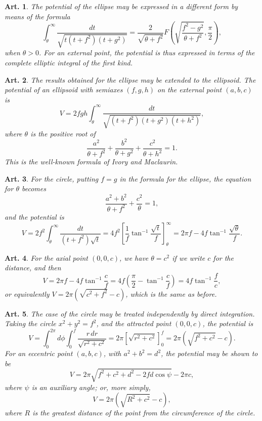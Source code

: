 \documentclass[12pt,a4paper]{article}
\theoremstyle{cayley}
\newtheorem{art}{Art.}[section]
\begin{document}
\begin{art}
The potential of the ellipse may be expressed in a different form by means of the formula
\[
\int_{\theta}^{\infty} \frac{dt}{\sqrt{t(t+f^2)(t+g^2)}}
= \frac{2}{\sqrt{\theta + f^2}}F\left(\sqrt{\frac{f^2-g^2}{\theta+f^2}}, \frac{\pi}{2}\right),
\]
when $\theta > 0$. For an external point, the potential is thus expressed in terms of the complete elliptic integral of the first kind.
\end{art}

\begin{art}
The results obtained for the ellipse may be extended to the ellipsoid. The potential of an ellipsoid with semiaxes $(f, g, h)$ on the external point $(a, b, c)$ is
\[
V = 2fgh\int_{\theta}^{\infty} \frac{dt}{\sqrt{(t+f^2)(t+g^2)(t+h^2)}},
\]
where $\theta$ is the positive root of
\[
\frac{a^2}{\theta+f^2} + \frac{b^2}{\theta+g^2} + \frac{c^2}{\theta+h^2} = 1.
\]
This is the well-known formula of Ivory and Maclaurin.
\end{art}

\begin{art}
For the circle, putting $f=g$ in the formula for the ellipse, the equation for $\theta$ becomes
\[
\frac{a^2+b^2}{\theta+f^2} + \frac{c^2}{\theta} = 1,
\]
and the potential is
\[
V = 2f^2\int_{\theta}^{\infty} \frac{dt}{(t+f^2)\sqrt{t}}
= 4f^2\left[\frac{1}{f}\tan^{-1}\frac{\sqrt{t}}{f}\right]_{\theta}^{\infty}
= 2\pi f - 4f\tan^{-1}\frac{\sqrt{\theta}}{f}.
\]
\end{art}

\begin{art}
For the axial point $(0, 0, c)$, we have $\theta = c^2$ if we write $c$ for the distance, and then
\[
V = 2\pi f - 4f\tan^{-1}\frac{c}{f}
= 4f\left(\frac{\pi}{2} - \tan^{-1}\frac{c}{f}\right)
= 4f\tan^{-1}\frac{f}{c},
\]
or equivalently $V = 2\pi(\sqrt{c^2+f^2} - c)$, which is the same as before.
\end{art}

\begin{art}
The case of the circle may be treated independently by direct integration. Taking the circle $x^2 + y^2 = f^2$, and the attracted point $(0, 0, c)$, the potential is
\[
V = \int_0^{2\pi} d\phi \int_0^f \frac{r\,dr}{\sqrt{r^2 + c^2}}
= 2\pi\left[\sqrt{r^2+c^2}\right]_0^f
= 2\pi(\sqrt{f^2+c^2} - c).
\]
For an eccentric point $(a, b, c)$, with $a^2 + b^2 = d^2$, the potential may be shown to be
\[
V = 2\pi\sqrt{f^2 + c^2 + d^2 - 2fd\cos\psi} - 2\pi c,
\]
where $\psi$ is an auxiliary angle; or, more simply,
\[
V = 2\pi(\sqrt{R^2 + c^2} - c),
\]
where $R$ is the greatest distance of the point from the circumference of the circle.
\end{art}
\end{document}
